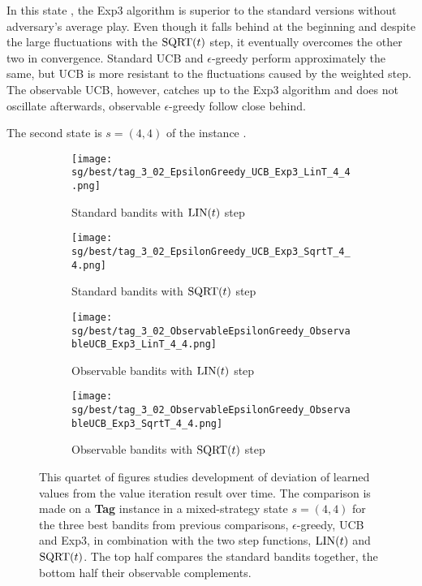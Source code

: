 \documentclass[../main.tex]{subfiles}
\begin{document}
In this state , the Exp3 algorithm is superior to the standard versions without adversary's average play.
Even though it falls behind at the beginning and despite the large fluctuations with the $\text{SQRT}(t)$ step, it eventually overcomes the other two in convergence.
Standard UCB and $\epsilon$-greedy perform approximately the same, but UCB is more resistant to the fluctuations caused by the weighted step.
The observable UCB, however, catches up to the Exp3 algorithm and does not oscillate afterwards, observable $\epsilon$-greedy follow close behind.

The second state is $s = \left(4, 4\right)$ of the instance  .
\begin{figure}[ht]
    \begin{subfigure}[t]{0.45\linewidth}
        \texttt{[image: sg/best/tag\_3\_02\_EpsilonGreedy\_UCB\_Exp3\_LinT\_4\_4.png]}
        \caption{Standard bandits with $\text{LIN}(t)$ step}
        \label{exp:sg:best:302:44:std:lin}
    \end{subfigure}
    \hfill
    \begin{subfigure}[t]{0.45\linewidth}
        \texttt{[image: sg/best/tag\_3\_02\_EpsilonGreedy\_UCB\_Exp3\_SqrtT\_4\_4.png]}
        \caption{Standard bandits with $\text{SQRT}(t)$ step}
        \label{exp:sg:best:302:44:std:sqrt}
    \end{subfigure}
    \begin{subfigure}[t]{0.45\linewidth}
        \texttt{[image: sg/best/tag\_3\_02\_ObservableEpsilonGreedy\_ObservableUCB\_Exp3\_LinT\_4\_4.png]}
        \caption{Observable bandits with $\text{LIN}(t)$ step}
        \label{exp:sg:best:302:44:obs:lint}
    \end{subfigure}
    \hfill
    \begin{subfigure}[t]{0.45\linewidth}
        \texttt{[image: sg/best/tag\_3\_02\_ObservableEpsilonGreedy\_ObservableUCB\_Exp3\_SqrtT\_4\_4.png]}
        \caption{Observable bandits with $\text{SQRT}(t)$ step}
        \label{exp:sg:best:302:44:obs:sqrt}
    \end{subfigure}
    \caption[Comparison of three best bandits and their observable counterparts on  in a state $s = \left(4, 4\right)$]{
        This quartet of figures studies development of deviation of learned values from the value iteration result over time.
        The comparison is made on a \textbf{Tag} instance  in a mixed-strategy state $s = \left(4, 4\right)$ for the three best bandits from previous comparisons, $\epsilon$-greedy, UCB and Exp3, in combination with the two step functions, $\text{LIN}(t)$ and $\text{SQRT}(t)$.
        The top half compares the standard bandits together, the bottom half their observable complements.
    }
    \label{exp:sg:best:302:44}
\end{figure}
\end{document}
